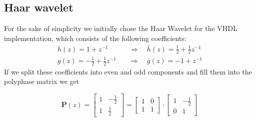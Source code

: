 \begin{refsection}
\subsection{Haar wavelet}
\label{fpga:sec:haar}

For the sake of simplicity we initially chose the Haar Wavelet for the VHDL implementation, which consists of the following coefficients:
\begin{align}
h(z) = 1 + z^{-1} \quad & \Rightarrow \quad \bar h(z) = \frac{1}{2} + \frac{1}{2} z^{-1}
\\
g(z) = - \frac{1}{2} + \frac{1}{2} z^{-1} \quad & \Rightarrow \quad \bar g(z) = -1 + z^{-1}
\end{align}
If we split these coefficients into even and odd components and fill them into the polyphase matrix we get 

\begin{equation*}
\bm P(z) =
\begin{bmatrix}
1 & -\frac{1}{2} \\
1 & \frac{1}{2}
\end{bmatrix}
 = 
 \begin{bmatrix}
 1 & 0 \\
 1 & 1
 \end{bmatrix}
 \cdot
 \begin{bmatrix}
 1 & -\frac{1}{2} \\
 0 & 1
 \end{bmatrix}
\end{equation*}


\end{refsection}
